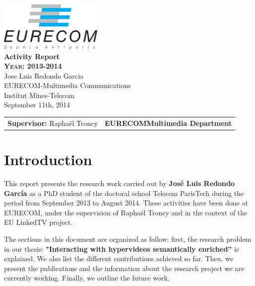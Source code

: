 \documentclass[a4paper,11pt]{report}
\begin{document}
\begin{titlepage}
\begin{center}
\includegraphics[width=5cm]{EURECOM_logo_quadri}
\\[3cm]
\textbf{\Huge{Activity Report}}
\\[2cm]
\textbf{\textsc{\LARGE{Year: 2013-2014}}}
\\[0.5cm]
\LARGE{Jose Luis Redondo Garcia}
\\[0.5cm]
\small{EURECOM-Multimedia Communications}
\\
\large{Institut Mines-Telecom}
\\
\large{September 11th, 2014}
\\[8cm]
\begin{tabular}{p{8cm} p{8.5cm}}
\small{\textbf{Supervisor:}\newline
Rapha\"el Troncy} 
&
\small{\textbf{EURECOM\newline Multimedia Department}}
\end{tabular}
\end{center}
\end{titlepage}


\chapter*{Introduction}

This report presents the research work carried out by \textbf{Jos\'e Luis Redondo Garc\'ia} as a PhD student of the doctoral school Telecom ParisTech during the period from September 2013 to August 2014. These activities have been done at EURECOM, under the supervision of Rapha\"el Troncy and in the context of the EU LinkedTV project.

The sections in this document are organized as follow: first, the research problem in our thesis: \textbf{"Interacting with hypervideos semantically enriched''} is explained. We also list the different contributions achieved so far. Then, we present the publications and the information about the research project we are currently working. Finally, we outline the future work.

\end{document}
